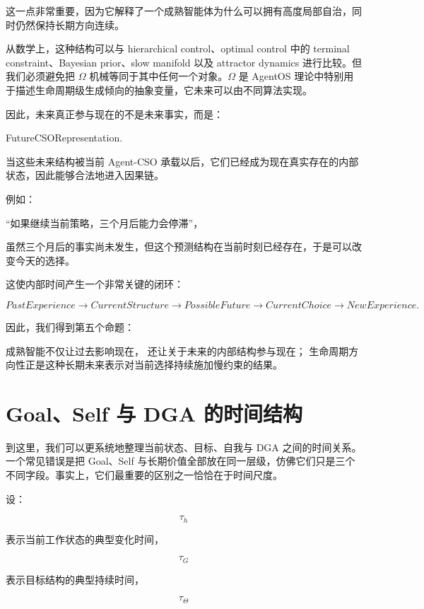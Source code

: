 这一点非常重要，因为它解释了一个成熟智能体为什么可以拥有高度局部自治，同时仍然保持长期方向连续。

从数学上，这种结构可以与 hierarchical control、optimal control 中的 terminal constraint、Bayesian prior、slow manifold 以及 attractor dynamics 进行比较。但我们必须避免把 $\Omega$ 机械等同于其中任何一个对象。$\Omega$ 是 AgentOS 理论中特别用于描述生命周期级生成倾向的抽象变量，它未来可以由不同算法实现。

因此，未来真正参与现在的不是未来事实，而是：

\begin{statementbox}
FutureCSORepresentation.
\end{statementbox}

当这些未来结构被当前 Agent-CSO 承载以后，它们已经成为现在真实存在的内部状态，因此能够合法地进入因果链。

例如：

“如果继续当前策略，三个月后能力会停滞”，

虽然三个月后的事实尚未发生，但这个预测结构在当前时刻已经存在，于是可以改变今天的选择。

这使内部时间产生一个非常关键的闭环：

\[
PastExperience
\rightarrow
CurrentStructure
\rightarrow
PossibleFuture
\rightarrow
CurrentChoice
\rightarrow
NewExperience.
\]

因此，我们得到第五个命题：

\begin{proposition*}
成熟智能不仅让过去影响现在，
还让关于未来的内部结构参与现在；
生命周期方向性正是这种长期未来表示对当前选择持续施加慢约束的结果。
\end{proposition*}

\section{Goal、Self 与 DGA 的时间结构}

到这里，我们可以更系统地整理当前状态、目标、自我与 DGA 之间的时间关系。一个常见错误是把 Goal、Self 与长期价值全部放在同一层级，仿佛它们只是三个不同字段。事实上，它们最重要的区别之一恰恰在于时间尺度。

设：

\[
\tau_h
\]

表示当前工作状态的典型变化时间，

\[
\tau_G
\]

表示目标结构的典型持续时间，

\[
\tau_\Theta
\]

